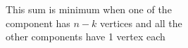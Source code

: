 \documentclass[preview]{standalone}
\begin{document}
\begin{center}
This sum is minimum when one of the\\ component has $n-k$ vertices and all the\\ other components have 1 vertex each
\end{center}
\end{document}
